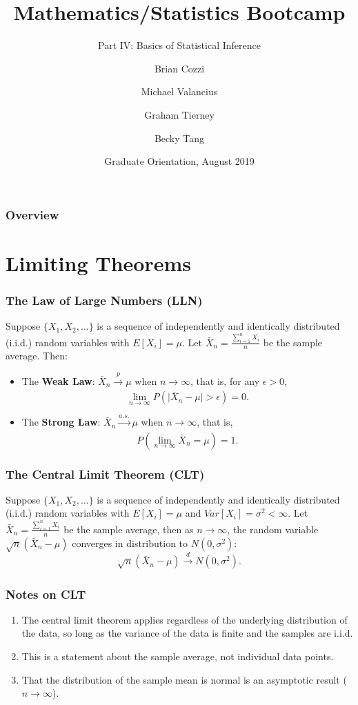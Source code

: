 \documentclass{beamer}
\title[Calculus]{Mathematics/Statistics Bootcamp} %
\subtitle{Part IV: Basics of Statistical Inference}
\author{Brian Cozzi\inst{1} \and Michael Valancius\inst{1} \and Graham Tierney\inst{1} \and Becky Tang\inst{1}}
\institute[Duke University] %
{
  \inst{1}%
  Department of Statistical Science\\
  Duke University
  }
\date{Graduate Orientation, August 2019}
\begin{document}
\begin{frame}
\titlepage %
\end{frame}

\begin{frame}
\frametitle{Overview} 
\tableofcontents 
\end{frame}

\section{Limiting Theorems}
\begin{frame}
\frametitle{The Law of Large Numbers (LLN)}
Suppose $\{X_1,X_2,\ldots\}$ is a sequence of independently and identically distributed (i.i.d.) random variables with $E[X_i] = \mu$. Let $\bar{X}_n = \frac{\sum_{i=1}^n X_i}{n}$ be the sample average. Then:
\begin{itemize}
\item The \textbf{Weak Law}: $\bar{X}_n \xrightarrow[]{p} \mu$ when $n \rightarrow \infty$, that is, for any $\epsilon > 0$,
$$
\lim_{n \rightarrow \infty}P(\vert \bar{X}_n -\mu\vert > \epsilon) = 0.
$$
\item The \textbf{Strong Law}: $\bar{X}_n \xrightarrow[]{a.s.} \mu$ when $n \rightarrow \infty$, that is, 
$$
P\left( \lim_{n \rightarrow \infty}\bar{X}_n =\mu \right) = 1.
$$
\end{itemize}

\end{frame}

\begin{frame}
\frametitle{The Central Limit Theorem (CLT)}
Suppose $\{X_1,X_2,\ldots\}$ is a sequence of independently and identically distributed (i.i.d.) random variables with $E[X_i] = \mu$ and $Var[X_i] = \sigma^2 < \infty$. Let $\bar{X}_n = \frac{\sum_{i=1}^n X_i}{n}$ be the sample average, then as $n \rightarrow \infty$, the random variable $\sqrt{n} (\bar{X}_n - \mu)$ converges in distribution to $N(0,\sigma^2)$:
$$
\sqrt{n} (\bar{X}_n - \mu) \xrightarrow[]{d} N(0,\sigma^2).
$$
\end{frame}

\begin{frame}
\frametitle{Notes on CLT}
\begin{enumerate}

\item The central limit theorem applies regardless of the underlying distribution of the data, so long as the variance of the data is finite and the samples are i.i.d.

\item This is a statement about the sample average, not individual data points.

\item That the distribution of the sample mean is normal is an asymptotic result ($n \rightarrow \infty$).
\end{enumerate}
\end{frame}
\end{document}
